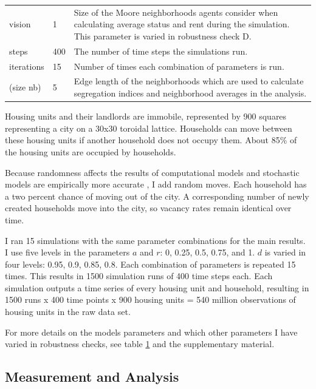\documentclass[a4paper,12pt]{article}
\begin{document}
\begin{table}[h!]
\begin{tabularx}{\textwidth}{l l X}
    vision & 1 & Size of the Moore neighborhoods agents consider when calculating average status and rent during the simulation. This parameter is varied in robustness check D. \\
    steps & 400 & The number of time steps the simulations run. \\
    iterations & 15 & Number of times each combination of parameters is run.\\
    (size nb) & 5 & Edge length of the neighborhoods which are used to calculate segregation indices and neighborhood averages in the analysis. \\
    \hline
    \end{tabularx}%
  \label{tab:parameters}%
\end{table}%

Housing units and their landlords are immobile, represented by 900 squares representing a city on a 30x30 toroidal lattice. Households can move between these housing units if another household does not occupy them. About 85\% of the housing units are occupied by households. 

Because randomness affects the results of computational models \citep{macySignalImportanceNoise2015} and stochastic models are empirically more accurate \citep{masRandomDeviationsImprove2020}, I add random moves. Each household has a two percent chance of moving out of the city. A corresponding number of newly created households move into the city, so vacancy rates remain identical over time.

I ran 15 simulations with the same parameter combinations for the main results. I use five levels in the parameters $a$ and $r$: 0, 0.25, 0.5, 0.75, and 1. $d$ is varied in four levels: 0.95, 0.9, 0.85, 0.8. Each combination of parameters is repeated 15 times. This results in 1500 simulation runs of 400 time steps each. Each simulation outputs a time series of every housing unit and household, resulting in 1500 runs x 400 time points x 900 housing units = 540 million observations of housing units in the raw data set.

For more details on the models parameters and which other parameters I have varied in robustness checks, see table \ref{tab:parameters} and the supplementary material.


\subsection*{Measurement and Analysis}
\end{document}
